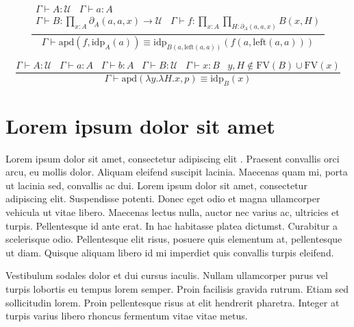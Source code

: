 \documentclass[a4paper,UKenglish,cleveref, autoref, thm-restate]{lipics-v2021}
\newcommand{\UU}{\ensuremath{\mathcal{U}}}
\begin{document}
\begin{equation*}
    \frac{\begin{matrix}
            \Gamma \vdash A : \UU \hspace{10pt} \Gamma \vdash a : A \\
            \Gamma \vdash B : \prod_{x : A} \partial_A(a, a, x) \rightarrow \UU \hspace{10pt} \Gamma \vdash f : \prod_{x : A} \prod_{H : \partial_A(a, a, x)} B(x, H)
          \end{matrix}}
         {\Gamma \vdash \mathrm{apd}(f, \mathrm{idp}_A(a)) \equiv \mathrm{idp}_{B(a, \mathrm{left}(a, a))}(f(a, \mathrm{left}(a, a)))}
\end{equation*}

\begin{equation*}
    \frac{\Gamma \vdash A : \UU \hspace{10pt} \Gamma \vdash a : A \hspace{10pt} \Gamma \vdash b : A \hspace{10pt} \Gamma \vdash B : \UU \hspace{10pt} \Gamma \vdash x : B \hspace{10pt} y, H \notin \mathrm{FV}(B) \cup \mathrm{FV}(x)}
         {\Gamma \vdash \mathrm{apd}(\lambda y.\lambda H.x, p) \equiv \mathrm{idp}_B(x)}
\end{equation*}


\section{Lorem ipsum dolor sit amet}

Lorem ipsum dolor sit amet, consectetur adipiscing elit \cite{DBLP:journals/cacm/Knuth74}. Praesent convallis orci arcu, eu mollis dolor. Aliquam eleifend suscipit lacinia. Maecenas quam mi, porta ut lacinia sed, convallis ac dui. Lorem ipsum dolor sit amet, consectetur adipiscing elit. Suspendisse potenti. Donec eget odio et magna ullamcorper vehicula ut vitae libero. Maecenas lectus nulla, auctor nec varius ac, ultricies et turpis. Pellentesque id ante erat. In hac habitasse platea dictumst. Curabitur a scelerisque odio. Pellentesque elit risus, posuere quis elementum at, pellentesque ut diam. Quisque aliquam libero id mi imperdiet quis convallis turpis eleifend. 

\begin{lemma}
\label{lemma:lorem}
Vestibulum sodales dolor et dui cursus iaculis. Nullam ullamcorper purus vel turpis lobortis eu tempus lorem semper. Proin facilisis gravida rutrum. Etiam sed sollicitudin lorem. Proin pellentesque risus at elit hendrerit pharetra. Integer at turpis varius libero rhoncus fermentum vitae vitae metus.
\end{lemma}
\end{document}

